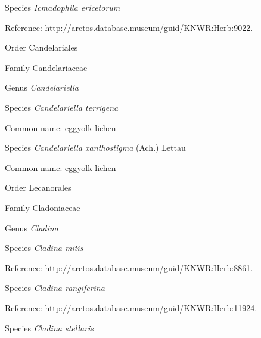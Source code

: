 \documentclass[9pt, article]{memoir}
\begin{document}
\begin{multicols}{2}
\vspace{6pt}\noindent\hspace{36pt}Species \textit{Icmadophila ericetorum}


Reference: 
\url{http://arctos.database.museum/guid/KNWR:Herb:9022}.

\vspace{6pt}\noindent\hspace{18pt}Order Candelariales


\vspace{6pt}\noindent\hspace{24pt}Family Candelariaceae


\vspace{6pt}\noindent\hspace{30pt}Genus \textit{Candelariella}


\vspace{6pt}\noindent\hspace{36pt}Species \textit{Candelariella terrigena}


Common name: eggyolk lichen

\vspace{6pt}\noindent\hspace{36pt}Species \textit{Candelariella xanthostigma} (Ach.) Lettau


Common name: eggyolk lichen

\vspace{6pt}\noindent\hspace{18pt}Order Lecanorales


\vspace{6pt}\noindent\hspace{24pt}Family Cladoniaceae


\vspace{6pt}\noindent\hspace{30pt}Genus \textit{Cladina}


\vspace{6pt}\noindent\hspace{36pt}Species \textit{Cladina mitis}


Reference: 
\url{http://arctos.database.museum/guid/KNWR:Herb:8861}.

\vspace{6pt}\noindent\hspace{36pt}Species \textit{Cladina rangiferina}


Reference: 
\url{http://arctos.database.museum/guid/KNWR:Herb:11924}.

\vspace{6pt}\noindent\hspace{36pt}Species \textit{Cladina stellaris}



\end{multicols}
\end{document}
